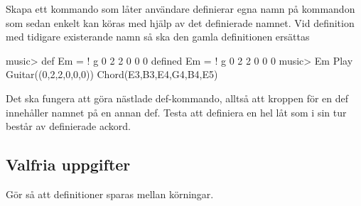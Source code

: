 {%



\Task Skapa ett kommando som låter användare definierar egna namn på kommandon som sedan enkelt kan köras med hjälp av det definierade namnet. Vid definition med tidigare existerande namn så ska den gamla definitionen ersättas
\begin{REPL}
music> def Em = ! g 0 2 2 0 0 0
defined Em = ! g 0 2 2 0 0 0
music> Em
Play Guitar((0,2,2,0,0,0)) Chord(E3,B3,E4,G4,B4,E5)
\end{REPL}
Det ska fungera att göra nästlade def-kommando, alltså att kroppen för en def innehåller namnet på en annan def. Testa att definiera en hel låt som i sin tur består av definierade ackord.

\Task 


\subsection{Valfria uppgifter}

\Task Gör så att definitioner sparas mellan körningar.

}
